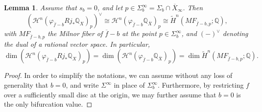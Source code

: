 \documentclass[12pt,leqno,twoside]{amsart}
\newtheorem{lemma}[theorem]{Lemma}
\theoremstyle{remark}
\theoremstyle{remark}
\theoremstyle{definition}
\theoremstyle{remark}
\theoremstyle{remark}
\theoremstyle{remark}
\numberwithin{equation}{section}  %
\def\be{\begin{equation}}
\def\ee{\end{equation}}
\newcommand{\cH}{\mathcal{H}}
\newcommand{\bQ}{\mathbb{Q}}
\newcommand{\of}{\overline{f}}
\newcommand{\oX}{\overline{X}}
\begin{document}
\begin{lemma}\label{identif}
Assume that $s_b=0$, and let $p\in \Sigma^\infty_b=\Sigma_b \cap \oX_\infty$. Then
\be\label{mfi} \left(\cH^n(\varphi_{\of-b}Rj_*\bQ_X)_p\right)^\vee \cong \cH^n(\varphi_{\of-b}\bQ_{\oX})_p \cong \widetilde{H}^n(MF_{\of-b,p};\bQ),\ee
with $MF_{\of-b,p}$ the Milnor fiber of $\of-b$ at the point $p\in \Sigma^\infty_b$, and $(-)^\vee$ denoting the dual of a rational vector space. In particular,
\be\label{mfi2}
\dim \left( \cH^n(\varphi_{\of-b}Rj_*\bQ_X)_p \right) =\dim \left( \cH^n(\varphi_{\of-b}\bQ_{\oX})_p \right)= \dim \widetilde{H}^n(MF_{\of-b,p};\bQ).
\ee
\end{lemma}

\begin{proof} In order to simplify the notations, we can assume without any loss of generality that $b=0$, and write $\Sigma^\infty$ in place of $\Sigma^\infty_b$. Furthermore, by restricting $f$ over a sufficiently small disc at the origin, we may further assume that $b=0$ is the only bifurcation value.


\end{proof}
\end{document}
